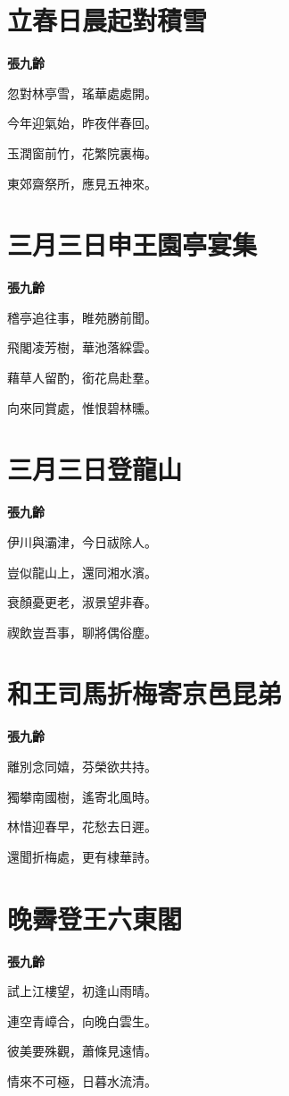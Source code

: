 \documentclass[12pt,a4paper]{ctexbook}
\begin{document}
\section{立春日晨起對積雪}
\textbf{張九齡}\par\vspace{0.5em}
忽對林亭雪，瑤華處處開。\par
今年迎氣始，昨夜伴春回。\par
玉潤窗前竹，花繁院裏梅。\par
東郊齋祭所，應見五神來。\par

\section{三月三日申王園亭宴集}
\textbf{張九齡}\par\vspace{0.5em}
稽亭追往事，睢苑勝前聞。\par
飛閣凌芳樹，華池落綵雲。\par
藉草人留酌，銜花鳥赴羣。\par
向來同賞處，惟恨碧林曛。\par

\section{三月三日登龍山}
\textbf{張九齡}\par\vspace{0.5em}
伊川與灞津，今日祓除人。\par
豈似龍山上，還同湘水濱。\par
衰顏憂更老，淑景望非春。\par
禊飲豈吾事，聊將偶俗塵。\par

\section{和王司馬折梅寄京邑昆弟}
\textbf{張九齡}\par\vspace{0.5em}
離別念同嬉，芬榮欲共持。\par
獨攀南國樹，遙寄北風時。\par
林惜迎春早，花愁去日遲。\par
還聞折梅處，更有棣華詩。\par

\section{晚霽登王六東閣}
\textbf{張九齡}\par\vspace{0.5em}
試上江樓望，初逢山雨晴。\par
連空青嶂合，向晚白雲生。\par
彼美要殊觀，蕭條見遠情。\par
情來不可極，日暮水流清。\par
\end{document}
